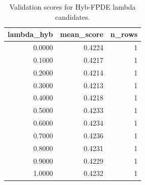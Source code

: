 \begin{table}[t]
\caption{Validation scores for Hyb-FPDE lambda candidates.}
\label{tab:lambda_distribution_computed}
\centering
\begin{tabular}{rrr}
\toprule
lambda\_hyb & mean\_score & n\_rows \\
\midrule
0.0000 & 0.4224 & 1 \\
0.1000 & 0.4217 & 1 \\
0.2000 & 0.4214 & 1 \\
0.3000 & 0.4213 & 1 \\
0.4000 & 0.4218 & 1 \\
0.5000 & 0.4233 & 1 \\
0.6000 & 0.4234 & 1 \\
0.7000 & 0.4236 & 1 \\
0.8000 & 0.4231 & 1 \\
0.9000 & 0.4229 & 1 \\
1.0000 & 0.4232 & 1 \\
\bottomrule
\end{tabular}

\end{table}
